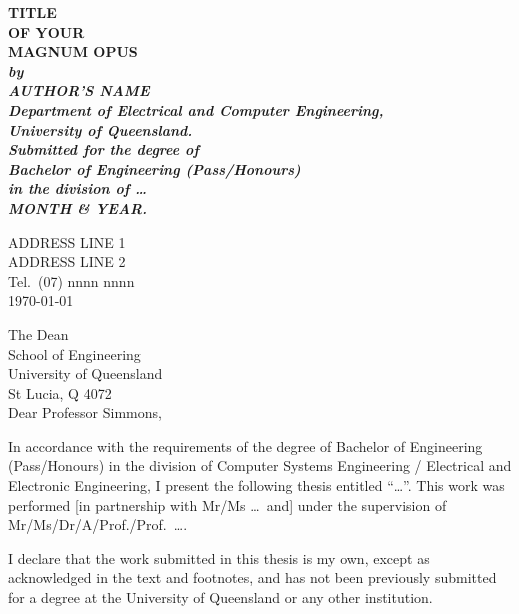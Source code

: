 \documentclass[12pt,openany,a4paper]{book}
\renewcommand{\baselinestretch}{1.2}	%
\begin{document}
\frontmatter

\begin{titlepage}
\renewcommand{\baselinestretch}{1.0}
\begin{center}
\vspace*{35mm}
\Huge\bf
		TITLE\\
		OF YOUR\\
		MAGNUM OPUS\\
\vspace{20mm}
\large\sl
		by\\
		AUTHOR'S NAME
		\medskip\\
\rm
		Department of Electrical and Computer Engineering,\\
		University of Queensland.\\
\vspace{30mm}
		Submitted for the degree of\\
		Bachelor of Engineering (Pass/Honours)
		\smallskip\\
\normalsize
		in the division of \ldots
		\medskip\\
\large
		MONTH \& YEAR.		
\end{center}
\end{titlepage}

\cleardoublepage

\begin{flushright}
	ADDRESS LINE 1\\
	ADDRESS LINE 2\\
	Tel.\ (07) nnnn nnnn\\
	\medskip
	\today
\end{flushright}
\begin{flushleft}
  The Dean\\
  School of Engineering\\
  University of Queensland\\
  St Lucia, Q 4072\\
  \bigskip\bigskip
  Dear Professor Simmons,
\end{flushleft}

In accordance with the requirements of the degree of Bachelor of
Engineering (Pass/Honours) in the division of Computer Systems
Engineering / Electrical and Electronic Engineering, I present the
following thesis entitled ``\ldots''.  This work was performed [in
partnership with Mr/Ms \ldots\ and] under the supervision of
Mr/Ms/Dr/A/Prof./Prof.~\ldots.

I declare that the work submitted in this thesis is my own, except as
acknowledged in the text and footnotes, and has not been previously
submitted for a degree at the University of Queensland or any other
institution.
\end{document}
